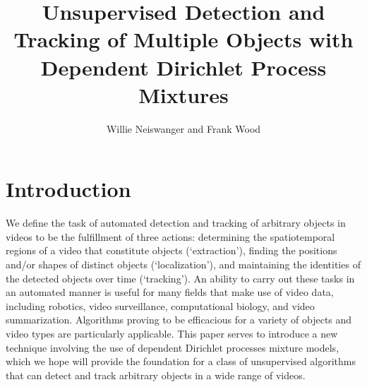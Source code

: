 \documentclass[smallcondensed, final]{svjour3}
\begin{document}
\title{Unsupervised Detection and Tracking of Multiple Objects with Dependent Dirichlet Process Mixtures}
\author{Willie Neiswanger and Frank Wood}
\maketitle
\mbox{}




\section{Introduction}

We define the task of automated detection and tracking of arbitrary objects in videos to be the fulfillment of three actions: determining the spatiotemporal regions of a video that constitute objects (`extraction'), finding the positions and/or shapes of distinct objects (`localization'), and maintaining the identities of the detected objects over time (`tracking'). An ability to carry out these tasks in an automated manner is useful for many fields that make use of video data, including robotics, video surveillance, computational biology, and video summarization. Algorithms proving to be efficacious for a variety of objects and video types are particularly applicable. This paper serves to introduce a new technique involving the use of dependent Dirichlet processes mixture models, which we hope will provide the foundation for a class of unsupervised algorithms that can detect and track arbitrary objects in a wide range of videos.
\end{document}
